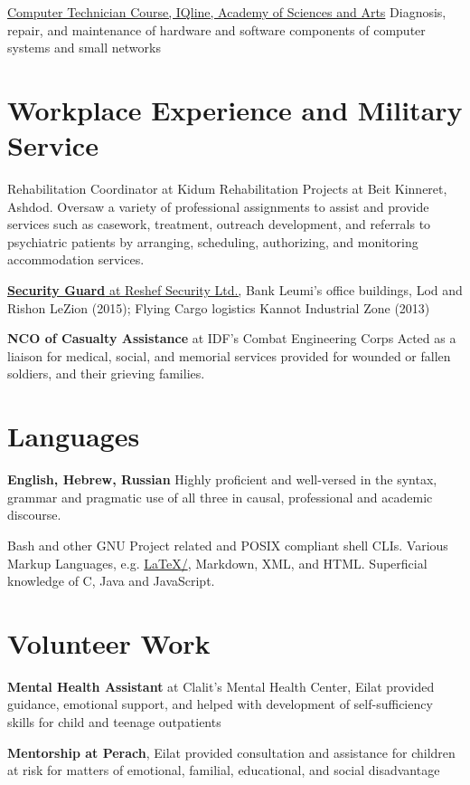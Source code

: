 {\href{https://www.dropbox.com/s/csphxdynjdg3ze2/computer-technitian-certificate.jpg?dl=0}{Computer Technician Course, IQline, Academy of Sciences and Arts}}
{Diagnosis, repair, and maintenance of hardware and software components of computer systems and small networks}
{}

\section{Workplace Experience and Military Service}

{Rehabilitation Coordinator at Kidum Rehabilitation Projects at Beit Kinneret, Ashdod.}
{Oversaw a variety of professional assignments to assist and provide services such as casework, treatment, outreach development, and referrals to psychiatric patients by arranging, scheduling, authorizing, and monitoring accommodation services.}
{}

{\href{https://www.dropbox.com/s/kr5rcui1zgp35i0/recommendation-letter-security-guard.jpg?dl=0}{\textbf{Security Guard} at Reshef Security Ltd.,}} 
{Bank Leumi's office buildings, Lod and Rishon LeZion (2015);
Flying Cargo logistics Kannot Industrial Zone (2013)}
{}

{\textbf{NCO of Casualty Assistance} at IDF's Combat Engineering Corps} 
{Acted as a liaison for medical, social, and memorial services provided for wounded or fallen soldiers, and their grieving families.}
{}

\section{Languages}

{\textbf{English, Hebrew, Russian}}
{Highly proficient and well-versed in the syntax, grammar and pragmatic use of all three in causal, professional and academic discourse.}
{}

{Bash and other GNU Project related and POSIX compliant shell CLIs. Various Markup Languages, e.g. \href{https://github.com/kiril-u/cv/}{\LaTeX/\XeTeX}, Markdown, XML, and HTML. Superficial knowledge of C, Java and JavaScript.}
{}

\section{Volunteer Work}

{\textbf{Mental Health Assistant} at Clalit's Mental Health Center, Eilat}
{provided guidance, emotional support, and helped with development of self-sufficiency skills for child and teenage outpatients}
{}

{\textbf{Mentorship at Perach}, Eilat}
{provided consultation and assistance for children at risk for matters of emotional, familial, educational, and social disadvantage}
{} 
\unsetLTR
